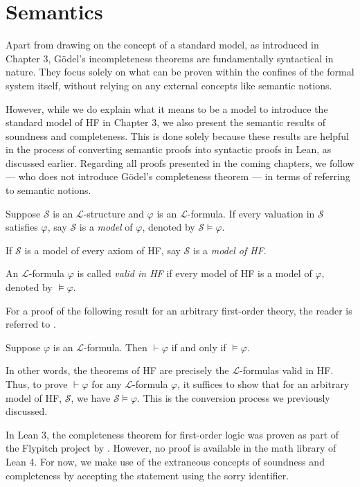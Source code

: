 \section{Semantics}

Apart from drawing on the concept of a standard model, as introduced in Chapter 3, 
Gödel's incompleteness theorems are fundamentally syntactical in nature. 
They focus solely on what can be proven within the confines of the formal system itself, 
without relying on any external concepts like semantic notions.

However, while we do explain what it means to be a model to introduce the standard model of 
HF in Chapter 3, we also present the semantic results of soundness and completeness. 
This is done solely because these results are helpful in the process of converting semantic proofs 
into syntactic proofs in Lean, as discussed earlier.
Regarding all proofs presented in the coming chapters, we follow 
\cite{swierczkowski2003finite} — who does not introduce Gödel's completeness theorem — 
in terms of referring to semantic notions.

\begin{definition}
    \label{def:models+Model+valid}
    \leanok
    Suppose $\mathcal{S}$ is an $\mathcal{L}$-structure and $\varphi$ is an $\mathcal{L}$-formula.
    If every valuation in $\mathcal{S}$ satisfies $\varphi$, 
    say $\mathcal{S}$ is a \textit{model} of $\varphi$, denoted by $\mathcal{S} \vDash \varphi$.

    If $\mathcal{S}$ is a model of every axiom of HF, say $\mathcal{S}$ is a \textit{model of HF}.
    
    An $\mathcal{L}$-formula $\varphi$ is called \textit{valid in HF} if 
    every model of HF is a model of $\varphi$, denoted by $\vDash \varphi$.
\end{definition}

For a proof of the following result for an arbitrary first-order theory, 
the reader is referred to  \cite{shoenfield1967mathematical}.

\begin{theorem}
    \label{thm:completeness}
    \leanok
    Suppose $\varphi$ is an $\mathcal{L}$-formula.
    Then $\vdash \varphi$ if and only if $\vDash \varphi$.
\end{theorem}

In other words, the theorems of HF are precisely the $\mathcal{L}$-formulas valid in HF.
Thus, to prove $\vdash \varphi$ for any $\mathcal{L}$-formula $\varphi$, it suffices to show that for an 
arbitrary model of HF, $\mathcal{S}$, we have $\mathcal{S} \vDash \varphi$.
This is the conversion process we previously discussed.

In Lean 3, the completeness theorem for first-order logic was proven as part of the Flypitch project
by \cite{han2020formal}.
However, no proof is available in the math library of Lean 4.
For now, we make use of the extraneous concepts of soundness and completeness 
by accepting the statement using the {\ttfamily \small sorry} identifier. 